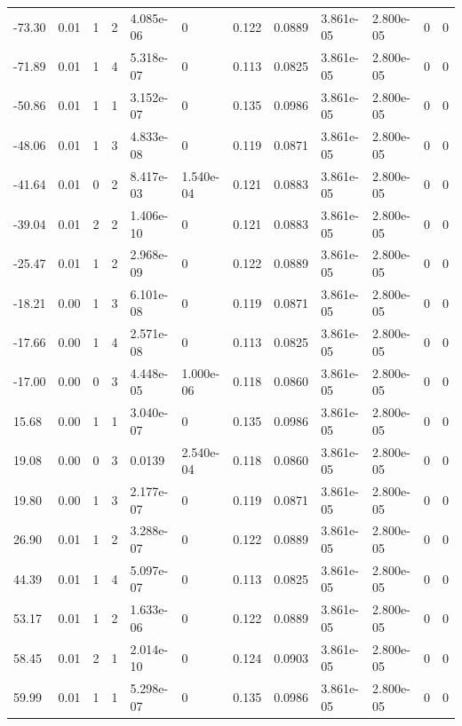 \documentclass[preview]{standalone}
\begin{document}
{{\begin{tabular}{L{1.2cm}C{1.2cm} C{0.3cm}C{0.5cm} C{1.4cm}C{1.4cm} C{1.4cm}C{1.4cm} C{1.6cm}C{1.6cm} C{1.6cm}C{1.6cm}}
  -73.30  &  0.01  & 1     &  2 &  4.085e-06  & 0  &  0.122&   0.0889& 3.861e-05 & 2.800e-05   &  0 & 0  \\ 
  -71.89  &  0.01  & 1     &  4 &  5.318e-07  & 0  &  0.113&   0.0825& 3.861e-05 & 2.800e-05   &  0 & 0  \\ 
  -50.86  &  0.01  & 1     &  1 &  3.152e-07  & 0  &  0.135&   0.0986& 3.861e-05 & 2.800e-05   &  0 & 0  \\ 
  -48.06  &  0.01  & 1     &  3 &  4.833e-08  & 0  &  0.119&   0.0871& 3.861e-05 & 2.800e-05   &  0 & 0  \\ 
  -41.64  &  0.01  & 0     &  2 &  8.417e-03  & 1.540e-04  &  0.121&   0.0883& 3.861e-05 & 2.800e-05   &  0 & 0  \\ 
  -39.04  &  0.01  & 2     &  2 &  1.406e-10  & 0  &  0.121&   0.0883& 3.861e-05 & 2.800e-05   &  0 & 0  \\ 
  -25.47  &  0.01  & 1     &  2 &  2.968e-09  & 0  &  0.122&   0.0889& 3.861e-05 & 2.800e-05   &  0 & 0  \\ 
  -18.21  &  0.00  & 1     &  3 &  6.101e-08  & 0  &  0.119&   0.0871& 3.861e-05 & 2.800e-05   &  0 & 0  \\ 
  -17.66  &  0.00  & 1     &  4 &  2.571e-08  & 0  &  0.113&   0.0825& 3.861e-05 & 2.800e-05   &  0 & 0  \\ 
  -17.00  &  0.00  & 0     &  3 &  4.448e-05  & 1.000e-06  &  0.118&   0.0860& 3.861e-05 & 2.800e-05   &  0 & 0  \\ 
  15.68  &  0.00  & 1     &  1 &  3.040e-07  & 0  &  0.135&   0.0986& 3.861e-05 & 2.800e-05   &  0 & 0  \\ 
  19.08  &  0.00  & 0     &  3 &  0.0139  & 2.540e-04  &  0.118&   0.0860& 3.861e-05 & 2.800e-05   &  0 & 0  \\ 
  19.80  &  0.00  & 1     &  3 &  2.177e-07  & 0  &  0.119&   0.0871& 3.861e-05 & 2.800e-05   &  0 & 0  \\ 
  26.90  &  0.01  & 1     &  2 &  3.288e-07  & 0  &  0.122&   0.0889& 3.861e-05 & 2.800e-05   &  0 & 0  \\ 
  44.39  &  0.01  & 1     &  4 &  5.097e-07  & 0  &  0.113&   0.0825& 3.861e-05 & 2.800e-05   &  0 & 0  \\ 
  53.17  &  0.01  & 1     &  2 &  1.633e-06  & 0  &  0.122&   0.0889& 3.861e-05 & 2.800e-05   &  0 & 0  \\ 
  58.45  &  0.01  & 2     &  1 &  2.014e-10  & 0  &  0.124&   0.0903& 3.861e-05 & 2.800e-05   &  0 & 0  \\ 
  59.99  &  0.01  & 1     &  1 &  5.298e-07  & 0  &  0.135&   0.0986& 3.861e-05 & 2.800e-05   &  0 & 0  \\ 

\end{tabular}}}
\end{document}
